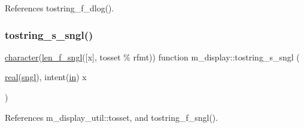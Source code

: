 References tostring\+\_\+f\+\_\+dlog().

\mbox{\label{namespacem__display_a05b3cac8d4c04e08dc99c7c23f1254ba}} 
\subsubsection{\texorpdfstring{tostring\+\_\+s\+\_\+sngl()}{tostring\_s\_sngl()}}
{\footnotesize\ttfamily \hyperlink{option__stopwatch_83_8txt_abd4b21fbbd175834027b5224bfe97e66}{character}(\hyperlink{namespacem__display_ae0feb946fbc4c31f8ba53e20719fa508}{len\+\_\+f\+\_\+sngl}(\mbox{[}x\mbox{]}, tosset \% rfmt)) function m\+\_\+display\+::tostring\+\_\+s\+\_\+sngl (\begin{DoxyParamCaption}\item[{\hyperlink{read__watch_83_8txt_abdb62bde002f38ef75f810d3a905a823}{real}(\hyperlink{namespacem__display_a2ac86bc535c3ccc5947dbb3109c666b5}{sngl}), intent(\hyperlink{M__journal_83_8txt_afce72651d1eed785a2132bee863b2f38}{in})}]{x }\end{DoxyParamCaption})\hspace{0.3cm}{\ttfamily [private]}}



References m\+\_\+display\+\_\+util\+::tosset, and tostring\+\_\+f\+\_\+sngl().

\mbox{\label{namespacem__display_ac6d80df8c70bb7d64df528d26851d6cb}} 
